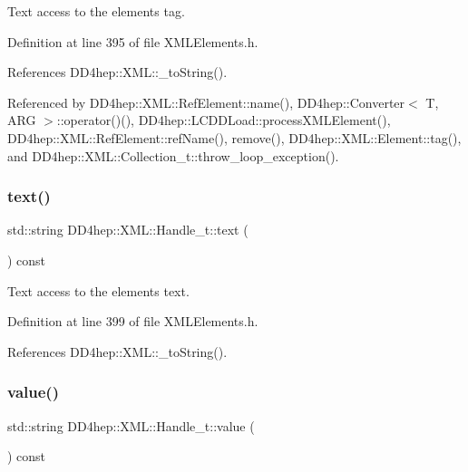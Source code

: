 Text access to the element\textquotesingle{}s tag. 



Definition at line 395 of file X\+M\+L\+Elements.\+h.



References D\+D4hep\+::\+X\+M\+L\+::\+\_\+to\+String().



Referenced by D\+D4hep\+::\+X\+M\+L\+::\+Ref\+Element\+::name(), D\+D4hep\+::\+Converter$<$ T, A\+R\+G $>$\+::operator()(), D\+D4hep\+::\+L\+C\+D\+D\+Load\+::process\+X\+M\+L\+Element(), D\+D4hep\+::\+X\+M\+L\+::\+Ref\+Element\+::ref\+Name(), remove(), D\+D4hep\+::\+X\+M\+L\+::\+Element\+::tag(), and D\+D4hep\+::\+X\+M\+L\+::\+Collection\+\_\+t\+::throw\+\_\+loop\+\_\+exception().

\hypertarget{class_d_d4hep_1_1_x_m_l_1_1_handle__t_aea331b719cb6948a414f4cd1040fc2a5}{}\label{class_d_d4hep_1_1_x_m_l_1_1_handle__t_aea331b719cb6948a414f4cd1040fc2a5} 
\subsubsection{\texorpdfstring{text()}{text()}}
{\footnotesize\ttfamily std\+::string D\+D4hep\+::\+X\+M\+L\+::\+Handle\+\_\+t\+::text (\begin{DoxyParamCaption}{ }\end{DoxyParamCaption}) const\hspace{0.3cm}{\ttfamily [inline]}}



Text access to the element\textquotesingle{}s text. 



Definition at line 399 of file X\+M\+L\+Elements.\+h.



References D\+D4hep\+::\+X\+M\+L\+::\+\_\+to\+String().

\hypertarget{class_d_d4hep_1_1_x_m_l_1_1_handle__t_a6ff80f9cd5e8424a557db10ac2616bbe}{}\label{class_d_d4hep_1_1_x_m_l_1_1_handle__t_a6ff80f9cd5e8424a557db10ac2616bbe} 
\subsubsection{\texorpdfstring{value()}{value()}}
{\footnotesize\ttfamily std\+::string D\+D4hep\+::\+X\+M\+L\+::\+Handle\+\_\+t\+::value (\begin{DoxyParamCaption}{ }\end{DoxyParamCaption}) const\hspace{0.3cm}{\ttfamily [inline]}}



